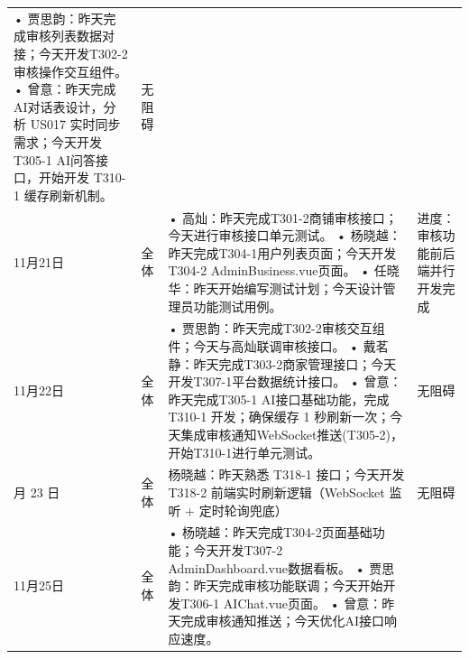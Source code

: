 \begin{levellist}
\begin{longtable}{>{\centering\arraybackslash}m{1cm} >{\centering\arraybackslash}m{1cm} >{\centering\arraybackslash}m{9cm} >{\centering\arraybackslash}m{2.5cm}}
        • 贾思韵：昨天完成审核列表数据对接；今天开发T302-2审核操作交互组件。 \newline
        • 曾意：昨天完成AI对话表设计，分析 US017 实时同步需求；今天开发T305-1 AI问答接口，开始开发 T310-1 缓存刷新机制。                         & 无阻碍                                                                                                                  \\
        11月21日                                                                                         & 全体                             & • 高灿：昨天完成T301-2商铺审核接口；今天进行审核接口单元测试。 \newline
        • 杨晓越：昨天完成T304-1用户列表页面；今天开发T304-2 AdminBusiness.vue页面。 \newline
        • 任晓华：昨天开始编写测试计划；今天设计管理员功能测试用例。                                                                & 进度： 审核功能前后端并行开发完成                                                                                                    \\
        11月22日                                                                                         & 全体                             & • 贾思韵：昨天完成T302-2审核交互组件；今天与高灿联调审核接口。 \newline
        • 戴茗静：昨天完成T303-2商家管理接口；今天开发T307-1平台数据统计接口。 \newline
        • 曾意：昨天完成T305-1 AI接口基础功能，完成 T310-1 开发；确保缓存 1 秒刷新一次；今天集成审核通知WebSocket推送(T305-2)，开始T310-1进行单元测试。 & 无阻碍                                                                                                                  \\
        11 月 23 日                                                                                      & 全体                             & 杨晓越：昨天熟悉 T318-1 接口；今天开发 T318-2 前端实时刷新逻辑（WebSocket 监听 + 定时轮询兜底）     & 无阻碍            \\
        11月25日                                                                                         & 全体                             & • 杨晓越：昨天完成T304-2页面基础功能；今天开发T307-2 AdminDashboard.vue数据看板。 \newline
        • 贾思韵：昨天完成审核功能联调；今天开始开发T306-1 AIChat.vue页面。 \newline
        • 曾意：昨天完成审核通知推送；今天优化AI接口响应速度。 \newline

\end{longtable}
\end{levellist}

